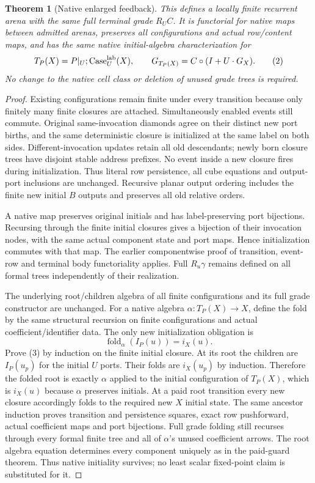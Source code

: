 \documentclass[11pt]{article}
\newtheorem{theorem}{Theorem}\newtheorem{proposition}[theorem]{Proposition}
\begin{document}
\begin{theorem}[Native enlarged feedback]
This defines a locally finite recurrent arena with the same full terminal grade $R_UC$. It is functorial for native maps between admitted arenas, preserves all configurations and actual row/content maps, and has the same native initial-algebra characterization for
\[
 T_P(X)=P|_U;\operatorname{Case}^{\rm lab}_U(X),\qquad
 G_{T_P(X)}=C\circ(I+U\cdot G_X).                           \tag{2}
\]
No change to the native cell class or deletion of unused grade trees is required.
\end{theorem}
\begin{proof}
Existing configurations remain finite under every transition because only finitely many finite closures are attached. Simultaneously enabled events still commute. Original same-invocation diamonds agree on their distinct new port births, and the same deterministic closure is initialized at the same label on both sides. Different-invocation updates retain all old descendants; newly born closure trees have disjoint stable address prefixes. No event inside a new closure fires during initialization. Thus literal row persistence, all cube equations and output-port inclusions are unchanged. Recursive planar output ordering includes the finite new initial $B$ outputs and preserves all old relative orders.

A native map preserves original initials and has label-preserving port bijections. Recursing through the finite initial closures gives a bijection of their invocation nodes, with the same actual component state and port maps. Hence initialization commutes with that map. The earlier componentwise proof of transition, event-row and terminal body functoriality applies. Full $R_u\gamma$ remains defined on all formal trees independently of their realization.

The underlying root/children algebra of all finite configurations and its full grade constructor are unchanged. For a native algebra $\alpha:T_P(X)\to X$, define the fold by the same structural recursion on finite configurations and actual coefficient/identifier data. The only new initialization obligation is
\[
 \operatorname{fold}_\alpha(I_P(u))=i_X(u).                 \tag{3}
\]
Prove (3) by induction on the finite initial closure. At its root the children are $I_P(u_p)$ for the initial $U$ ports. Their folds are $i_X(u_p)$ by induction. Therefore the folded root is exactly $\alpha$ applied to the initial configuration of $T_P(X)$, which is $i_X(u)$ because $\alpha$ preserves initials. At a paid root transition every new closure accordingly folds to the required new $X$ initial state. The same ancestor induction proves transition and persistence squares, exact row pushforward, actual coefficient maps and port bijections. Full grade folding still recurses through every formal finite tree and all of $\alpha$'s unused coefficient arrows. The root algebra equation determines every component uniquely as in the paid-guard theorem. Thus native initiality survives; no least scalar fixed-point claim is substituted for it.
\end{proof}
\end{document}
